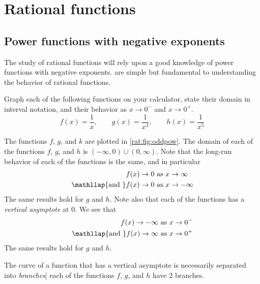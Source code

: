 \section{Rational functions}
 \subsection*{Power functions with negative exponents}
	 The study of rational functions will rely upon a good knowledge
	 of power functions with negative exponents.  are
	 simple but fundamental to understanding the behavior of rational functions.
	 \begin{pccexample}\label{rat:ex:oddpow}
		 Graph each of the following functions on your calculator, state their domain in interval notation, and their
		 behavior as $x\rightarrow 0^-$ and $x\rightarrow 0^+$.
		 \[
			 f(x)=\frac{1}{x},\qquad g(x)=\dfrac{1}{x^3},\qquad h(x)=\dfrac{1}{x^5}
		 \]
		 \begin{pccsolution}
			 The functions $f$, $g$, and $k$ are plotted in \cref{rat:fig:oddpow}.
			 The domain of each of the functions $f$, $g$, and $h$ is $(-\infty,0)\cup (0,\infty)$. Note that
			 the long-run behavior of each of the functions is the same, and in particular
			 \begin{align*}
				 f(x)\rightarrow 0                         & \text{ as } x\rightarrow\infty  \\
				 \mathllap{\text{and }}  f(x)\rightarrow 0 & \text{ as } x\rightarrow-\infty
			 \end{align*}
			 The same results hold for $g$ and $h$. Note also that each of the functions
			 has a \emph{vertical asymptote} at $0$. We see that
			 \begin{align*}
				 f(x)\rightarrow -\infty                         & \text{ as } x\rightarrow 0^- \\
				 \mathllap{\text{and }}   f(x)\rightarrow \infty & \text{ as } x\rightarrow 0^+
			 \end{align*}
			 The same results hold for $g$ and $h$.

			 The curve of a function that has a vertical asymptote is necessarily separated
			 into \emph{branches}| each of the functions $f$, $g$, and $h$ have $2$ branches.
		 \end{pccsolution}
	 \end{pccexample}

